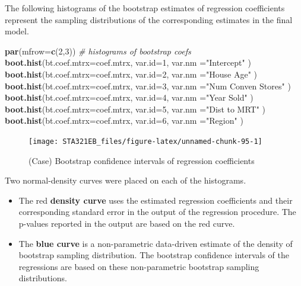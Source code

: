 \documentclass[
]{book}
\newenvironment{Shaded}{\begin{snugshade}}{\end{snugshade}}
\newcommand{\AttributeTok}[1]{\textcolor[rgb]{0.13,0.29,0.53}{#1}}
\newcommand{\CommentTok}[1]{\textcolor[rgb]{0.56,0.35,0.01}{\textit{#1}}}
\newcommand{\DecValTok}[1]{\textcolor[rgb]{0.00,0.00,0.81}{#1}}
\newcommand{\FunctionTok}[1]{\textcolor[rgb]{0.13,0.29,0.53}{\textbf{#1}}}
\newcommand{\NormalTok}[1]{#1}
\newcommand{\StringTok}[1]{\textcolor[rgb]{0.31,0.60,0.02}{#1}}
\begin{document}
The following histograms of the bootstrap estimates of regression coefficients represent the sampling distributions of the corresponding estimates in the final model.

\begin{Shaded}
\begin{Highlighting}[]
\FunctionTok{par}\NormalTok{(}\AttributeTok{mfrow=}\FunctionTok{c}\NormalTok{(}\DecValTok{2}\NormalTok{,}\DecValTok{3}\NormalTok{))  }\CommentTok{\# histograms of bootstrap coefs}
\FunctionTok{boot.hist}\NormalTok{(}\AttributeTok{bt.coef.mtrx=}\NormalTok{coef.mtrx, }\AttributeTok{var.id=}\DecValTok{1}\NormalTok{, }\AttributeTok{var.nm =}\StringTok{"Intercept"}\NormalTok{ )}
\FunctionTok{boot.hist}\NormalTok{(}\AttributeTok{bt.coef.mtrx=}\NormalTok{coef.mtrx, }\AttributeTok{var.id=}\DecValTok{2}\NormalTok{, }\AttributeTok{var.nm =}\StringTok{"House Age"}\NormalTok{ )}
\FunctionTok{boot.hist}\NormalTok{(}\AttributeTok{bt.coef.mtrx=}\NormalTok{coef.mtrx, }\AttributeTok{var.id=}\DecValTok{3}\NormalTok{, }\AttributeTok{var.nm =}\StringTok{"Num Conven Stores"}\NormalTok{ )}
\FunctionTok{boot.hist}\NormalTok{(}\AttributeTok{bt.coef.mtrx=}\NormalTok{coef.mtrx, }\AttributeTok{var.id=}\DecValTok{4}\NormalTok{, }\AttributeTok{var.nm =}\StringTok{"Year Sold"}\NormalTok{ )}
\FunctionTok{boot.hist}\NormalTok{(}\AttributeTok{bt.coef.mtrx=}\NormalTok{coef.mtrx, }\AttributeTok{var.id=}\DecValTok{5}\NormalTok{, }\AttributeTok{var.nm =}\StringTok{"Dist to MRT"}\NormalTok{ )}
\FunctionTok{boot.hist}\NormalTok{(}\AttributeTok{bt.coef.mtrx=}\NormalTok{coef.mtrx, }\AttributeTok{var.id=}\DecValTok{6}\NormalTok{, }\AttributeTok{var.nm =}\StringTok{"Region"}\NormalTok{ )}
\end{Highlighting}
\end{Shaded}

\begin{figure}

{\centering \texttt{[image: STA321EB\_files/figure-latex/unnamed-chunk-95-1]} 

}

\caption{(Case) Bootstrap confidence intervals of regression coefficients}\label{fig:unnamed-chunk-95}
\end{figure}

Two normal-density curves were placed on each of the histograms.

\begin{itemize}
\item
  The red \textbf{density curve} uses the estimated regression coefficients and their corresponding standard error in the output of the regression procedure. The p-values reported in the output are based on the red curve.
\item
  The \textbf{blue curve} is a non-parametric data-driven estimate of the density of bootstrap sampling distribution. The bootstrap confidence intervals of the regressions are based on these non-parametric bootstrap sampling distributions.
\end{itemize}
\end{document}
